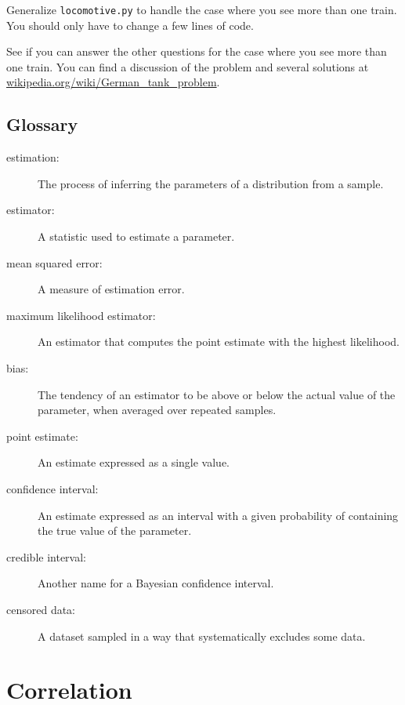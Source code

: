 \documentclass[12pt]{book}
\begin{document}
\begin{ex}

Generalize \verb"locomotive.py" to handle the case where you
see more than one train.  You should only have to
change a few lines of code.

See if you can answer the other questions for the case where you
see more than one train.  You can find a discussion of the problem
and several solutions at
\url{wikipedia.org/wiki/German_tank_problem}.

\end{ex}

\section{Glossary}

\begin{description}

\item[estimation:] The process of inferring the parameters of a distribution
from a sample.

\item[estimator:] A statistic used to estimate a parameter.

\item[mean squared error:] A measure of estimation error.

\item[maximum likelihood estimator:] An estimator that computes the
point estimate with the highest likelihood.

\item[bias:] The tendency of an estimator to be above or below the actual
value of the parameter, when averaged over repeated samples.

\item[point estimate:] An estimate expressed as a single value.

\item[confidence interval:] An estimate expressed as an interval with a
given probability of containing the true value of the parameter.

\item[credible interval:] Another name for a Bayesian confidence interval.

\item[censored data:] A dataset sampled in a way that systematically
excludes some data.

\end{description}


\chapter{Correlation}
\end{document}
